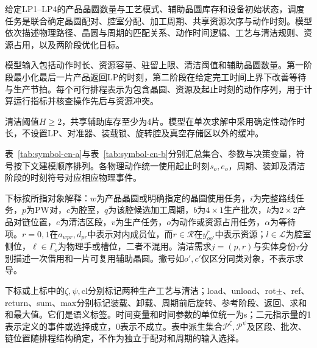 \documentclass[final,5p,times,twocolumn]{elsarticle}
\begin{document}
给定LP1--LP4的产品晶圆数量与工艺模式、辅助晶圆库存和设备初始状态，调度任务是联合确定晶圆配对、腔室分配、加工周期、共享资源次序与动作时刻。模型依次描述物理路径、晶圆与周期的匹配关系、动作时间逻辑、工艺与清洁规则、资源占用，以及两阶段优化目标。

模型输入包括动作时长、资源容量、驻留上限、清洁阈值和辅助晶圆数量。第一阶段最小化最后一片产品返回LP的时刻，第二阶段在给定完工时间上界下改善等待与生产节拍。每个可行排程表示为包含晶圆、资源及起止时刻的动作序列，用于计算运行指标并核查操作先后与资源冲突。

清洁阈值$H\ge2$，共享辅助库存至少为4片。模型在单次求解中采用确定性动作时长，不设置LP、对准器、装载锁、旋转腔及真空存储区以外的缓冲。

表~\ref{tab:symbol-cn-a}与表~\ref{tab:symbol-cn-b}分别汇总集合、参数与决策变量，符号按下文建模顺序排列。各物理动作统一使用起止时刻$s_o,e_o$，周期、装卸及清洁阶段的时刻符号对应相应物理事件。

下标按所指对象解释：$w$为产品晶圆或明确指定的晶圆使用任务，$i$为完整路线任务，$p$为PW对，$c$为腔室，$q$为该腔候选加工周期，$b$为$4\times1$生产批次，$k$为$2\times2$产品对链位置，$e$为清洁区段，$v$为生产任务，$o$为动作或资源占用任务，$\alpha$为等待项。$r=0,1$在$a_{wpr},d_{pr}$中表示对内成员位，而$r\in\mathcal R$在$y^r_{oo'}$中表示资源；$l\in\mathcal L$为腔室侧位，$\ell\in\Gamma_o$为物理手或槽位，二者不混用。清洁需求$j=(p,r)$与实体身份$\tau$分别描述一次借用和一片可复用辅助晶圆。撇号如$o',c'$仅区分同类对象，不表示求导。

下标或上标中的$\zeta,\psi,\mathrm{cl}$分别标记两种生产工艺与清洁；load、unload、rot$\pm$、ref、return、sum、max分别标记装载、卸载、周期前后旋转、参考阶段、返回、求和和最大值。它们是语义标签。时间变量和时间参数的单位统一为s；二元指示量的1表示定义的事件或选择成立，0表示不成立。表中派生集合$\mathcal P^{\zeta},\mathcal P^{\psi}$及区段、批次、链位置随排程结构确定，不作为独立于配对和周期的输入选择。
\end{document}
